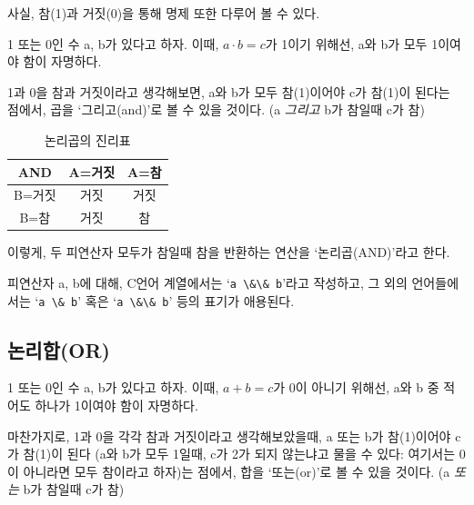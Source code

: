 \documentclass[a4paper,12pt]{book}
\newcommand{\V}[1]{\Verb|#1|}
\begin{document}
\begin{appendices}
        사실, 참(1)과 거짓(0)을 통해 명제 또한 다루어 볼 수 있다.

        1 또는 0인 수 a, b가 있다고 하자.
        이때, $a \cdot b = c$가 1이기 위해선,
        a와 b가 모두 1이여야 함이 자명하다.

        1과 0을 참과 거짓이라고 생각해보면,
        a와 b가 모두 참(1)이어야 c가 참(1)이 된다는 점에서,
        곱을 `그리고(and)'로 볼 수 있을 것이다.
        ({a \textit{그리고} b}가 참일때 c가 참)


        \begin{table}[H]
            \centering

            \caption{논리곱의 진리표}

            \begin{tabular}{ || c || c | c || }
                \hline
                AND   & A=거짓 & A=참 \\
                \hline\hline
                B=거짓 &   거짓 & 거짓 \\
                \hline
                B=참   &  거짓 &   참 \\
                \hline
            \end{tabular}
        \end{table}

        이렇게, 두 피연산자 모두가 참일때 참을 반환하는 연산을 `논리곱(AND)'라고 한다.

        피연산자 a, b에 대해, C언어 계열에서는 `\V{a \&\& b}'라고 작성하고,
        그 외의 언어들에서는 `\V{a \& b}' 혹은 `\V{a \&\& b}' 등의 표기가 애용된다.


    \subsection{논리합(OR)}

        1 또는 0인 수 a, b가 있다고 하자.
        이때, $a + b = c$가 0이 아니기 위해선,
        a와 b 중 적어도 하나가 1이여야 함이 자명하다.

        마찬가지로, 1과 0을 각각 참과 거짓이라고 생각해보았을때,
        a 또는 b가 참(1)이어야 c가 참(1)이 된다
        (a와 b가 모두 1일때, c가 2가 되지 않는냐고 물을 수 있다:
        여기서는 0이 아니라면 모두 참이라고 하자)는 점에서,
        합을 `또는(or)'로 볼 수 있을 것이다.
        ({a \textit{또는} b}가 참일때 c가 참)

        \begin{table}[H]
            \centering


\end{table}
\end{appendices}
\end{document}
